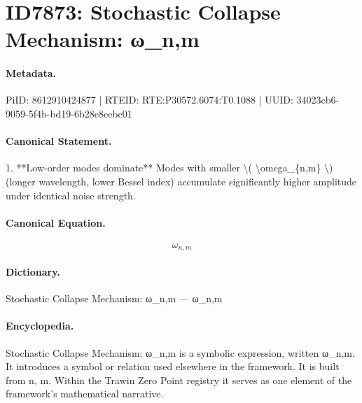 \section*{ID7873: Stochastic Collapse Mechanism: ω\_n,m}
\paragraph{Metadata.}
PiID: 8612910424877 | RTEID: RTE:P30572.6074:T0.1088 | UUID: 34023cb6-9059-5f4b-bd19-6b28e8eebc01

\paragraph{Canonical Statement.}
1. **Low-order modes dominate** Modes with smaller \textbackslash{}( \textbackslash{}omega\_\{n,m\} \textbackslash{}) (longer wavelength, lower Bessel index) accumulate significantly higher amplitude under identical noise strength.

\paragraph{Canonical Equation.}
\[
\omega_{n,m}
\]

\paragraph{Dictionary.}
Stochastic Collapse Mechanism: ω\_n,m — ω\_n,m

\paragraph{Encyclopedia.}
Stochastic Collapse Mechanism: ω\_n,m is a symbolic expression, written ω\_n,m. It introduces a symbol or relation used elsewhere in the framework. It is built from n, m. Within the Trawin Zero Point registry it serves as one element of the framework's mathematical narrative.
